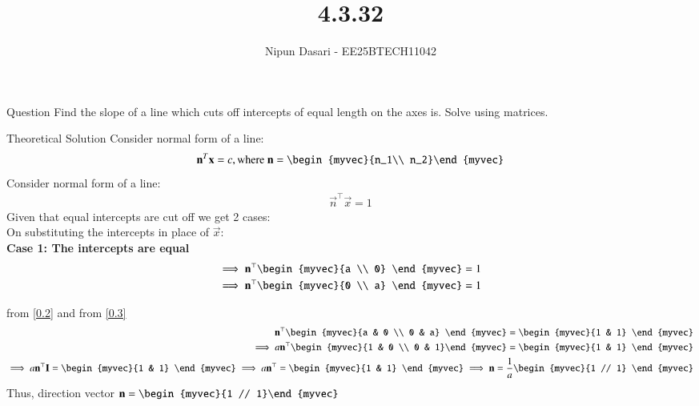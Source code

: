 \documentclass{beamer}
\title %
{4.3.32}
\author %
{Nipun Dasari - EE25BTECH11042}
\begin{document}
	
	\frame{\titlepage}
	\begin{frame}{Question}
		Find the slope of a line which cuts off intercepts of equal length on the axes is. Solve using matrices. \\
	\end{frame}
	
	
	\begin{frame}{Theoretical Solution}
	Consider normal form of a line:
	\begin{align}
		\vec{n}^T\vec{x} = c, \text{where } \vec{n} = \begin{myvec}{n_1\\ n_2}\end{myvec}
	\end{align}
Consider normal form of a line:
\begin{align}
	\vec{n}^\top\vec{x} = 1
\end{align}
Given that equal intercepts are cut off we get 2 cases:\\
On substituting the intercepts in place of $\vec{x}$: \\
\textbf{Case 1: The intercepts are equal }
\begin{align}
	\implies  \vec{n}^\top\begin{myvec}{a \\ 0} \end{myvec} = 1  \label{0.2}\\
	\implies \vec{n}^\top\begin{myvec}{0 \\ a} \end{myvec} = 1  \label{0.3} \\
\end{align}

from \eqref{0.2} and from \eqref{0.3}
\begin{align}
	\vec{n}^\top\begin{myvec}{a & 0 \\ 0 & a} \end{myvec} = \begin{myvec}{1 & 1} \end{myvec} \\
	\implies a\vec{n}^\top\begin{myvec}{1 & 0 \\ 0 & 1}\end{myvec} = \begin{myvec}{1 & 1} \end{myvec}\\
	\implies a\vec{n}^\top\vec{I} = \begin{myvec}{1 & 1} \end{myvec}
	\implies a\vec{n}^\top = \begin{myvec}{1 & 1} \end{myvec}
	\implies \vec{n} = \frac{1}{a}\begin{myvec}{1 // 1} \end{myvec}
\end{align}
Thus, direction vector $\vec{n} = \begin{myvec}{1 // 1}\end{myvec}$
		
	\end{frame}
\end{document}
